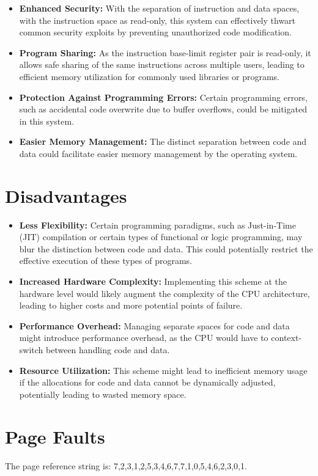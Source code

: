 \documentclass{article}
\begin{document}
\begin{itemize}
	\item \textbf{Enhanced Security:} With the separation of instruction and data spaces, with the instruction space as read-only, this system can effectively thwart common security exploits by preventing unauthorized code modification.
	\item \textbf{Program Sharing:} As the instruction base-limit register pair is read-only, it allows safe sharing of the same instructions across multiple users, leading to efficient memory utilization for commonly used libraries or programs.
	\item \textbf{Protection Against Programming Errors:} Certain programming errors, such as accidental code overwrite due to buffer overflows, could be mitigated in this system.
	\item \textbf{Easier Memory Management:} The distinct separation between code and data could facilitate easier memory management by the operating system.
\end{itemize}

\section*{Disadvantages}

\begin{itemize}
	\item \textbf{Less Flexibility:} Certain programming paradigms, such as Just-in-Time (JIT) compilation or certain types of functional or logic programming, may blur the distinction between code and data. This could potentially restrict the effective execution of these types of programs.
	\item \textbf{Increased Hardware Complexity:} Implementing this scheme at the hardware level would likely augment the complexity of the CPU architecture, leading to higher costs and more potential points of failure.
	\item \textbf{Performance Overhead:} Managing separate spaces for code and data might introduce performance overhead, as the CPU would have to context-switch between handling code and data.
	\item \textbf{Resource Utilization:} This scheme might lead to inefficient memory usage if the allocations for code and data cannot be dynamically adjusted, potentially leading to wasted memory space.
\end{itemize}


\section{Page Faults}
The page reference string is: 7,2,3,1,2,5,3,4,6,7,7,1,0,5,4,6,2,3,0,1.
\end{document}
